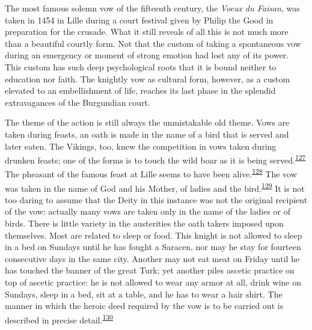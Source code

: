 The most famous solemn vow of the fifteenth century, the \emph{Voeux du
Faisan}, was taken in 1454 in Lille during a court festival given by
Philip the Good in preparation for the crusade. What it still reveals of
all this is not much more than a beautiful courtly form. Not that the
custom of taking a spontaneous vow during an emergency or moment of
strong emotion had lost any of its power. This custom has such deep
psychological roots that it is bound neither to education nor faith. The
knightly vow as cultural form, however, as a custom elevated to an
embellishment of life, reaches its last phase in the splendid
extravagances of the Burgundian court.

The theme of the action is still always the unmistakable old theme. Vows
are taken during feasts, an oath is made in the name of a bird that is
served and later eaten. The Vikings, too, knew the
\protect\hypertarget{10_Chapter_Three__THE_HEROIC_DREAM.xhtmlux5cux23page_102}{}{}competition
in vows taken during drunken feasts; one of the forms is to touch the
wild boar as it is being
served.\textsuperscript{\protect\hypertarget{10_Chapter_Three__THE_HEROIC_DREAM.xhtmlux5cux23id_1681}{\protect\hyperlink{23_NOTES.xhtmlux5cux23id_1682}{127}}}
The pheasant of the famous feast at Lille seems to have been
alive.\textsuperscript{\protect\hypertarget{10_Chapter_Three__THE_HEROIC_DREAM.xhtmlux5cux23id_1679}{\protect\hyperlink{23_NOTES.xhtmlux5cux23id_1680}{128}}}
The vow was taken in the name of God and his Mother, of ladies and the
bird.\textsuperscript{\protect\hypertarget{10_Chapter_Three__THE_HEROIC_DREAM.xhtmlux5cux23id_1677}{\protect\hyperlink{23_NOTES.xhtmlux5cux23id_1678}{129}}}
It is not too daring to assume that the Deity in this instance was not
the original recipient of the vow: actually many vows are taken only in
the name of the ladies or of birds. There is little variety in the
austerities the oath takers imposed upon themselves. Most are related to
sleep or food. This knight is not allowed to sleep in a bed on Sundays
until he has fought a Saracen, nor may he stay for fourteen consecutive
days in the same city. Another may not eat meat on Friday until he has
touched the banner of the great Turk; yet another piles ascetic practice
on top of ascetic practice: he is not allowed to wear any armor at all,
drink wine on Sundays, sleep in a bed, sit at a table, and he has to
wear a hair shirt. The manner in which the heroic deed required by the
vow is to be carried out is described in precise
detail.\textsuperscript{\protect\hypertarget{10_Chapter_Three__THE_HEROIC_DREAM.xhtmlux5cux23id_1675}{\protect\hyperlink{23_NOTES.xhtmlux5cux23id_1676}{130}}}

